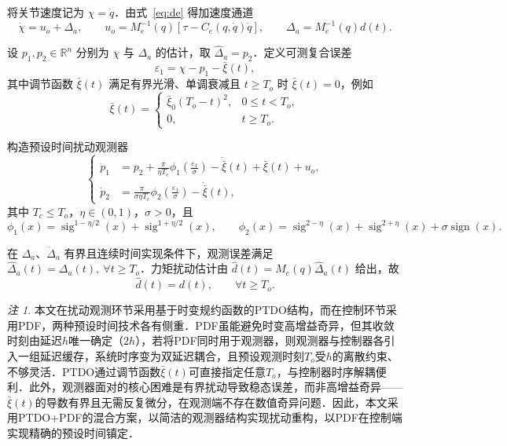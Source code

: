 \documentclass[12pt,a4paper]{article}
\theoremstyle{definition}
\theoremstyle{remark}
\newtheorem{remark}{注}[section]
\newcommand{\sign}{\operatorname{sign}}
\newcommand{\sig}{\operatorname{sig}}
\newcommand{\R}{\mathbb{R}}
\newcommand{\ve}{\varepsilon}
\begin{document}
将关节速度记为 $\chi=\dot q$．由式~\eqref{eq:de} 得加速度通道
\begin{equation}
  \dot\chi=u_o+\Delta_a,\qquad
  u_o=M_e^{-1}(q)[\tau-C_e(q,\dot q)\dot q],\qquad
  \Delta_a=M_e^{-1}(q)d(t) .
\end{equation}

设 $p_1,p_2\in\R^n$ 分别为 $\chi$ 与 $\Delta_a$ 的估计，取 $\hat\Delta_a=p_2$．定义可测复合误差
\begin{equation}\label{eq:eps1}
  \ve_1=\chi-p_1-\bar\xi(t),
\end{equation}
其中调节函数 $\bar\xi(t)$ 满足有界光滑、单调衰减且 $t\ge T_o$ 时 $\bar\xi(t)=0$，例如
\begin{equation}
  \bar\xi(t)=\begin{cases}
    \bar\xi_0(T_o-t)^2, & 0\le t<T_o,\\
    0, & t\ge T_o .
  \end{cases}
\end{equation}

构造预设时间扰动观测器\cite{song2017,holloway2019}
\begin{equation}\label{eq:ptdo}
  \left\{
  \begin{aligned}
    \dot p_1
    &=p_2+\frac{\pi}{\eta T_c}\phi_1\!\left(\frac{\ve_1}{\sigma}\right)
      -\dot{\bar\xi}(t)+\bar\xi(t)+u_o,\\[4pt]
    \dot p_2
    &=\frac{\pi}{\sigma\eta T_c}\phi_2\!\left(\frac{\ve_1}{\sigma}\right)
      -\dot{\bar\xi}(t),
  \end{aligned}
  \right.
\end{equation}
其中 $T_c\le T_o$，$\eta\in(0,1)$，$\sigma>0$，且
\begin{equation}
  \phi_1(x)=\sig^{1-\eta/2}(x)+\sig^{1+\eta/2}(x),\qquad
  \phi_2(x)=\sig^{2-\eta}(x)+\sig^{2+\eta}(x)+\sigma\sign(x) .
\end{equation}

在 $\Delta_a$、$\dot\Delta_a$ 有界且连续时间实现条件下，观测误差满足 $\hat\Delta_a(t)=\Delta_a(t),\ \forall t\ge T_o$．力矩扰动估计由 $\hat d(t)=M_e(q)\hat\Delta_a(t)$ 给出，故
\begin{equation}\label{eq:dhat_eq}
  \hat d(t)=d(t),\qquad \forall t\ge T_o .
\end{equation}

\begin{remark}
本文在扰动观测环节采用基于时变规约函数的PTDO结构，而在控制环节采用PDF，两种预设时间技术各有侧重．PDF虽能避免时变高增益奇异，但其收敛时刻由延迟$h$唯一确定（$2h$），若将PDF同时用于观测器，则观测器与控制器各引入一组延迟缓存，系统时序变为双延迟耦合，且预设观测时刻$T_o$受$h$的离散约束、不够灵活．PTDO通过调节函数$\bar\xi(t)$可直接指定任意$T_o$，与控制器时序解耦便利．此外，观测器面对的核心困难是有界扰动导致稳态误差，而非高增益奇异——$\bar\xi(t)$的导数有界且无需反复微分，在观测端不存在数值奇异问题．因此，本文采用PTDO+PDF的混合方案，以简洁的观测器结构实现扰动重构，以PDF在控制端实现精确的预设时间镇定．
\end{remark}
\end{document}
